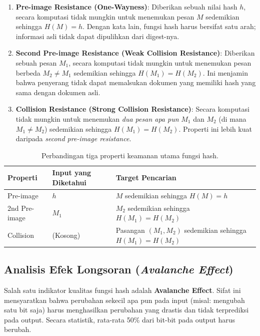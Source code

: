 \begin{enumerate}
    \item \textbf{Pre-image Resistance (One-Wayness)}:
    Diberikan sebuah nilai hash $h$, secara komputasi tidak mungkin untuk menemukan pesan $M$ sedemikian sehingga $H(M) = h$. Dengan kata lain, fungsi hash harus bersifat satu arah; informasi asli tidak dapat dipulihkan dari digest-nya.

    \item \textbf{Second Pre-image Resistance (Weak Collision Resistance)}:
    Diberikan sebuah pesan $M_1$, secara komputasi tidak mungkin untuk menemukan pesan berbeda $M_2 \neq M_1$ sedemikian sehingga $H(M_1) = H(M_2)$. Ini menjamin bahwa penyerang tidak dapat memalsukan dokumen yang memiliki hash yang sama dengan dokumen asli.

    \item \textbf{Collision Resistance (Strong Collision Resistance)}:
    Secara komputasi tidak mungkin untuk menemukan \textit{dua pesan apa pun} $M_1$ dan $M_2$ (di mana $M_1 \neq M_2$) sedemikian sehingga $H(M_1) = H(M_2)$. Properti ini lebih kuat daripada \textit{second pre-image resistance}.
\end{enumerate}

\begin{table}[htbp]
  \centering
  \small
  \begin{tabular}{lll}
    \toprule
    \textbf{Properti} & \textbf{Input yang Diketahui} & \textbf{Target Pencarian} \\
    \midrule
    Pre-image & $h$ & $M$ sedemikian sehingga $H(M) = h$ \\
    2nd Pre-image & $M_1$ & $M_2$ sedemikian sehingga $H(M_1) = H(M_2)$ \\
    Collision & (Kosong) & Pasangan $(M_1, M_2)$ sedemikian sehingga $H(M_1) = H(M_2)$ \\
    \bottomrule
  \end{tabular}
  \caption{Perbandingan tiga properti keamanan utama fungsi hash.}
  \label{tab:hash-properties}
\end{table}

\subsection{Analisis Efek Longsoran (\textit{Avalanche Effect})}

Salah satu indikator kualitas fungsi hash adalah \textbf{Avalanche Effect}. Sifat ini mensyaratkan bahwa perubahan sekecil apa pun pada input (misal: mengubah satu bit saja) harus menghasilkan perubahan yang drastis dan tidak terprediksi pada output. Secara statistik, rata-rata 50\% dari bit-bit pada output harus berubah.


